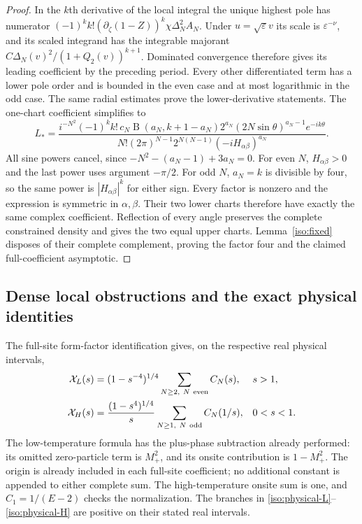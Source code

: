 \documentclass[11pt]{article}
\numberwithin{equation}{section}
\theoremstyle{definition}
\newcommand{\eps}{\varepsilon}
\begin{document}
\begin{proof}
In the $k$th derivative of the local integral the unique highest
pole has numerator
$(-1)^k k!(\partial_\zeta(1-Z))^k\chi\Delta_N^2 A_N$.
Under $u=\sqrt\eps v$ its scale is $\eps^{-\nu}$, and its
scaled integrand has the integrable majorant
$C\Delta_N(v)^2/(1+Q_2(v))^{k+1}$. Dominated convergence
therefore gives its leading coefficient by the preceding period.
Every other differentiated term has a lower pole order and is
bounded in the even case and at most logarithmic in the odd case.
The same radial estimates prove the lower-derivative statements.
The one-chart coefficient simplifies to
\begin{equation}\label{iso:amplitude}
 L_*=
 \frac{i^{-N^2}(-1)^k k!\,c_N\operatorname B(a_N,k+1-a_N)
       2^{a_N}(2N\sin\theta)^{a_N-1}e^{-ik\theta}}
 {N!(2\pi)^{N-1}2^{N(N-1)}(-iH_{\alpha\beta})^{a_N}}.
\end{equation}
All sine powers cancel, since $-N^2-(a_N-1)+3a_N=0$.
For even $N$, $H_{\alpha\beta}>0$ and the last power uses
argument $-\pi/2$. For odd $N$, $a_N=k$ is divisible by four,
so the same power is $|H_{\alpha\beta}|^k$ for either sign.
Every factor is nonzero and the expression is symmetric in
$\alpha,\beta$. Their two lower charts therefore have exactly
the same complex coefficient. Reflection of every angle preserves
the complete constrained density and gives the two equal upper
charts. Lemma~\ref{iso:fixed} disposes of their complete complement,
proving the factor four and the claimed full-coefficient asymptotic.
\end{proof}

\subsection{Dense local obstructions and the exact physical identities}

The full-site form-factor identification gives, on the respective real
physical intervals,
\begin{align}
 \mathcal X_L(s)&=(1-s^{-4})^{1/4}
                  \sum_{N\ge2,\ N\ {\rm even}}C_N(s),
                  &&s>1,\label{iso:physical-L}\\
 \mathcal X_H(s)&=\frac{(1-s^4)^{1/4}}s
                  \sum_{N\ge1,\ N\ {\rm odd}}C_N(1/s),
                  &&0<s<1.\label{iso:physical-H}
\end{align}
The low-temperature formula has the plus-phase subtraction already
performed: its omitted zero-particle term is $M_+^2$, and its onsite
contribution is $1-M_+^2$. The origin is already included in each full-site coefficient; no
additional constant is appended to either complete sum.
The high-temperature onsite sum is one, and $C_1=1/(E-2)$ checks the
normalization. The branches in \eqref{iso:physical-L}--\eqref{iso:physical-H}
are positive on their stated real intervals.
\end{document}
